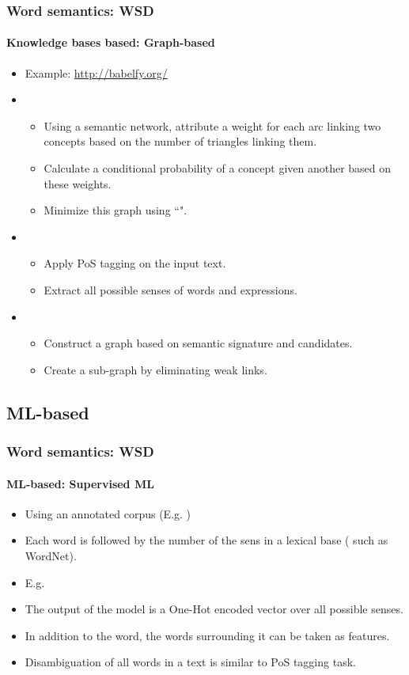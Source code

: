 \documentclass[xcolor=table]{beamer}
\begin{document}
\begin{frame}
\frametitle{Word semantics: WSD}
\framesubtitle{Knowledge bases based: Graph-based}
	
\begin{itemize}
	\item Example: \url{http://babelfy.org/} \cite{2014-moro-al}
	\item {}
	\begin{itemize}
		\item Using a semantic network, attribute a weight for each arc linking two concepts based on the number of triangles linking them.
		\item Calculate a conditional probability of a concept given another based on these weights.
		\item Minimize this graph using ``".
	\end{itemize}
	\item {}
	\begin{itemize}
		\item Apply PoS tagging on the input text.
		\item Extract all possible senses of words and expressions.
	\end{itemize}
	\item {}
	\begin{itemize}
		\item Construct a graph based on semantic signature and candidates.
		\item Create a sub-graph by eliminating weak links.
	\end{itemize}
\end{itemize}

\end{frame}

\subsection{ML-based}

\begin{frame}
\frametitle{Word semantics: WSD}
\framesubtitle{ML-based: Supervised ML}
	
\begin{itemize}
	\item Using an annotated corpus (E.g. )
	\item Each word is followed by the number of the sens in a lexical base ( such as WordNet).
	\item E.g. 
	\item The output of the model is a One-Hot encoded vector over all possible senses. 
	\item In addition to the word, the words surrounding it can be taken as features.
	\item Disambiguation of all words in a text is similar to PoS tagging task.
\end{itemize}
	
\end{frame}
\end{document}
